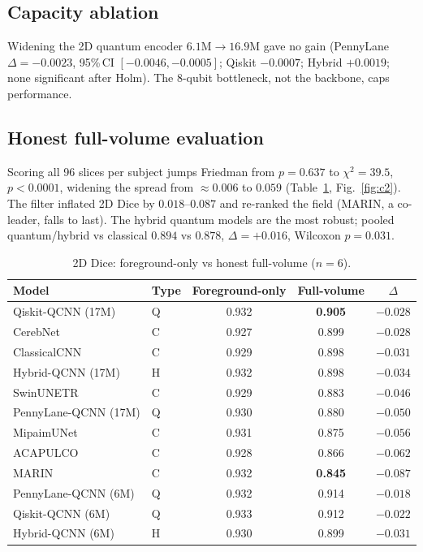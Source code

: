 \documentclass[runningheads]{llncs}
\begin{document}
\subsection{Capacity ablation}
Widening the 2D quantum encoder $6.1$M${\to}16.9$M gave no gain (PennyLane
$\Delta{=}{-}0.0023$, 95\%\,CI $[-0.0046,-0.0005]$; Qiskit $-0.0007$; Hybrid
$+0.0019$; none significant after Holm). The 8-qubit bottleneck, not the
backbone, caps performance.

\subsection{Honest full-volume evaluation}
Scoring all 96 slices per subject jumps Friedman from $p{=}0.637$ to
$\chi^2{=}39.5$, $p{<}0.0001$, widening the spread from ${\approx}0.006$ to
$0.059$ (Table~\ref{tab:c2}, Fig.~\ref{fig:c2}). The filter inflated 2D Dice by
$0.018$--$0.087$ and re-ranked the field (MARIN, a co-leader, falls to last). The
hybrid quantum models are the most robust; pooled quantum/hybrid vs classical
$0.894$ vs $0.878$, $\Delta{=}{+}0.016$, Wilcoxon $p{=}0.031$.

\begin{table}[t]\centering
\caption{2D Dice: foreground-only vs honest full-volume ($n{=}6$).}
\label{tab:c2}\setlength{\tabcolsep}{6pt}
\begin{tabular}{llccc}
\toprule
Model & Type & Foreground-only & Full-volume & $\Delta$\\
\midrule
Qiskit-QCNN (17M) & Q & 0.932 & \textbf{0.905} & $-0.028$\\
CerebNet & C & 0.927 & 0.899 & $-0.028$\\
ClassicalCNN & C & 0.929 & 0.898 & $-0.031$\\
Hybrid-QCNN (17M) & H & 0.932 & 0.898 & $-0.034$\\
SwinUNETR & C & 0.929 & 0.883 & $-0.046$\\
PennyLane-QCNN (17M) & Q & 0.930 & 0.880 & $-0.050$\\
MipaimUNet & C & 0.931 & 0.875 & $-0.056$\\
ACAPULCO & C & 0.928 & 0.866 & $-0.062$\\
MARIN & C & 0.932 & \textbf{0.845} & $-0.087$\\
\midrule
PennyLane-QCNN (6M) & Q & 0.932 & 0.914 & $-0.018$\\
Qiskit-QCNN (6M) & Q & 0.933 & 0.912 & $-0.022$\\
Hybrid-QCNN (6M) & H & 0.930 & 0.899 & $-0.031$\\
\bottomrule
\end{tabular}
\end{table}
\end{document}
